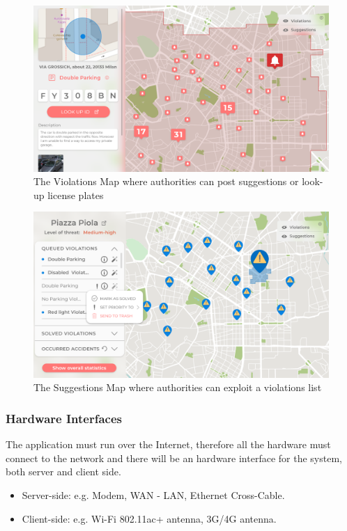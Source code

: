 \documentclass[12pt,a4paper]{article}
\begin{document}
					\begin{figure}[H]
						\centering
						\includegraphics[width=1.0\linewidth]{images/exports/authority/reports-list.png}
						\caption{The Violations Map where authorities can post suggestions or look-up license plates}
						\label{}
					\end{figure}
 					\begin{figure}[H]
						\centering
						\includegraphics[width=1.0\linewidth]{images/exports/authority/suggestions-list.png}
						\caption{The Suggestions Map where authorities can exploit a violations list}
						\label{}
					\end{figure}
		\newpage
\subsubsection{Hardware Interfaces}
The application must run over the Internet, therefore all the hardware must connect to the network and there will be an hardware interface for the system, both server and client side.
		\begin{itemize}
			\item Server-side: e.g. Modem, WAN - LAN, Ethernet Cross-Cable.
			\item Client-side: e.g. Wi-Fi 802.11ac+ antenna, 3G/4G antenna.
		\end{itemize}
\end{document}

